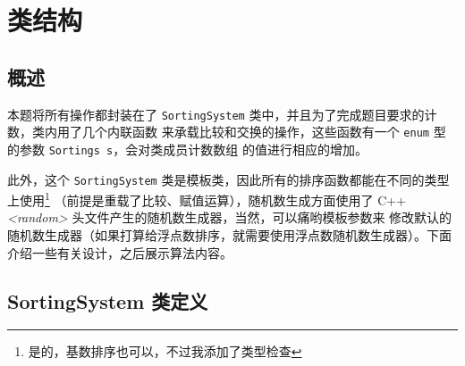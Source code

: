 
\chapter{类结构}

\section{概述}
本题将所有操作都封装在了 \lstinline{SortingSystem} 类中，并且为了完成题目要求的计数，类内用了几个内联函数%
来承载比较和交换的操作，这些函数有一个 \lstinline{enum} 型的参数 \lstinline{Sortings s}，会对类成员计数数组%
的值进行相应的增加。

此外，这个 \lstinline{SortingSystem} 类是模板类，因此所有的排序函数都能在不同的类型上使用\footnote{是的，基数排序也可以，不过我添加了类型检查}%
（前提是重载了比较、赋值运算），随机数生成方面使用了 C++ \emph{<random>} 头文件产生的随机数生成器，当然，可以痛哟模板参数来%
修改默认的随机数生成器（如果打算给浮点数排序，就需要使用浮点数随机数生成器）。下面介绍一些有关设计，之后展示算法内容。

\section{SortingSystem 类定义}


